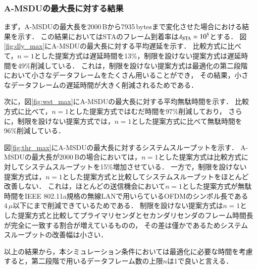 \documentclass[master]{kuisthesis}		%
\begin{document}
		\subsubsection{A-MSDUの最大長に対する結果}
			まず，A-MSDUの最大長を2000\,Bから7935\,bytesまで変化させた場合における結果を示す．
			この結果においてはSTAのフレーム到着率は$\lambda_{\rm STA}=10^5$とする．
			図\ref{fig:dly_max}にA-MSDUの最大長に対する平均遅延を示す．
			比較方式に比べて，$n=1$とした提案方式は遅延時間を13\%，制限を設けない提案方式は遅延時間を49\%削減している．
			これは，制限を設けない提案方式は最適化の第二段階において小さなデータフレームをたくさん用いることができ，
			その結果，小さなデータフレームの遅延時間が大きく削減されるためである．
			\par
			次に，図\ref{fig:wst_max}にA-MSDUの最大長に対する平均無駄時間を示す．
			比較方式に比べて，$n=1$とした提案方式ではむだ時間を97\%削減しており，
			さらに，制限を設けない提案方式では，$n=1$とした提案方式に比べて無駄時間を96\%削減している．
			\par
			図\ref{fig:thr_max}にA-MSDUの最大長に対するシステムスループットを示す．
			A-MSDUの最大長が2000\,Bの場合においては，$n=1$とした提案方式は比較方式に対してシステムスループットを15\%増加させている．
			一方で，制限を設けない提案方式は，$n=1$とした提案方式と比較してシステムスループットをほとんど改善しない．
			これは，ほとんどの送信機会において$n=1$とした提案方式が無駄時間をIEEE 802.11a規格の無線LANで用いらているOFDMのシンボル長である$4\,\mu$以下にまで削減できているためである．
			制限を設けない提案方式は$n=1$とした提案方式と比較してプライマリセンダとセカンダリセンダのフレーム時間長が完全に一致する割合が増えているものの，
			その差は僅かであるためシステムスループットの改善幅は小さい．
			\par
			以上の結果から，本シミュレーション条件においては最適化に必要な時間を考慮すると，第二段階で用いるデータフレーム数の上限$n$は1で良いと言える．
\end{document}
